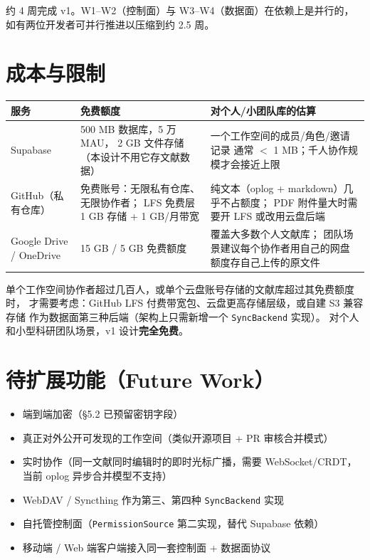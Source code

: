 \documentclass[12pt, a4paper]{article}
\begin{document}
约 4 周完成 v1。W1--W2（控制面）与 W3--W4（数据面）在依赖上是并行的，
如有两位开发者可并行推进以压缩到约 2.5 周。

\section{成本与限制}

\begin{longtable}{p{3.2cm} p{4cm} p{5.1cm}}
  \toprule
  \textbf{服务} & \textbf{免费额度} & \textbf{对个人/小团队库的估算} \\
  \midrule
  Supabase & 500 MB 数据库，5 万 MAU，
    2 GB 文件存储（本设计不用它存文献数据） & 一个工作空间的成员/角色/邀请记录
    通常 $<$ 1 MB；千人协作规模才会接近上限 \\
  GitHub（私有仓库） & 免费账号：无限私有仓库、无限协作者；
    LFS 免费层 1 GB 存储 + 1 GB/月带宽 & 纯文本（oplog + markdown）几乎不占额度；
    PDF 附件量大时需要开 LFS 或改用云盘后端 \\
  Google Drive / OneDrive & 15 GB / 5 GB 免费额度 & 覆盖大多数个人文献库；
    团队场景建议每个协作者用自己的网盘额度存自己上传的原文件 \\
  \bottomrule
\end{longtable}

\begin{tcolorbox}[notebox, title={何时需要考虑付费}]
  单个工作空间协作者超过几百人，或单个云盘账号存储的文献库超过其免费额度时，
  才需要考虑：GitHub LFS 付费带宽包、云盘更高存储层级，或自建 S3 兼容存储
  作为数据面第三种后端（架构上只需新增一个 \texttt{SyncBackend} 实现）。
  对个人和小型科研团队场景，v1 设计\textbf{完全免费}。
\end{tcolorbox}

\section{待扩展功能（Future Work）}

\begin{itemize}[leftmargin=2em, itemsep=2pt]
  \item 端到端加密（\S5.2 已预留密钥字段）
  \item 真正对外公开可发现的工作空间（类似开源项目 + PR 审核合并模式）
  \item 实时协作（同一文献同时编辑时的即时光标广播，需要 WebSocket/CRDT，
        当前 oplog 异步合并模型不支持）
  \item WebDAV / Syncthing 作为第三、第四种 \texttt{SyncBackend} 实现
  \item 自托管控制面（\texttt{PermissionSource} 第二实现，替代 Supabase 依赖）
  \item 移动端 / Web 端客户端接入同一套控制面 + 数据面协议
\end{itemize}
\end{document}
